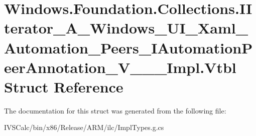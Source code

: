 \hypertarget{struct_windows_1_1_foundation_1_1_collections_1_1_i_iterator___a___windows___u_i___xaml___automa79e11edd6b9a090b215eb23d43c29204}{}\section{Windows.\+Foundation.\+Collections.\+I\+Iterator\+\_\+\+A\+\_\+\+Windows\+\_\+\+U\+I\+\_\+\+Xaml\+\_\+\+Automation\+\_\+\+Peers\+\_\+\+I\+Automation\+Peer\+Annotation\+\_\+\+V\+\_\+\+\_\+\+\_\+\+Impl.\+Vtbl Struct Reference}
\label{struct_windows_1_1_foundation_1_1_collections_1_1_i_iterator___a___windows___u_i___xaml___automa79e11edd6b9a090b215eb23d43c29204}


The documentation for this struct was generated from the following file\+:\begin{DoxyCompactItemize}
\item 
I\+V\+S\+Calc/bin/x86/\+Release/\+A\+R\+M/ilc/Impl\+Types.\+g.\+cs\end{DoxyCompactItemize}
